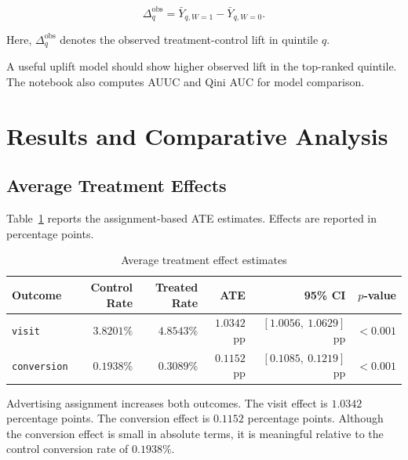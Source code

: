 \documentclass[journal,11pt,onecolumn]{IEEEtran}
\begin{document}
\begin{equation}
    \Delta^{\mathrm{obs}}_q
    =
    \bar{Y}_{q,W=1}
    -
    \bar{Y}_{q,W=0}.
    \label{eq:observed_lift}
\end{equation}

Here, \(\Delta^{\mathrm{obs}}_q\) denotes the observed treatment-control lift in quintile \(q\).

A useful uplift model should show higher observed lift in the top-ranked quintile. The notebook also computes AUUC and Qini AUC for model comparison.

\section{Results and Comparative Analysis}

\subsection{Average Treatment Effects}

Table~\ref{tab:ate_results} reports the assignment-based ATE estimates. Effects are reported in percentage points.

\begin{table}[!htbp]
    \centering
    \caption{Average treatment effect estimates}
    \label{tab:ate_results}
    \small
    \begin{tabular}{lrrrrr}
        \toprule
        Outcome & Control Rate             & Treated Rate & ATE & 95\% CI & \(p\)-value \\
        \midrule
        \texttt{visit}
                & \(3.8201\%\)
                & \(4.8543\%\)
                & \(1.0342\) pp
                & \([1.0056,\ 1.0629]\) pp
                & \(<0.001\)                                                            \\

        \texttt{conversion}
                & \(0.1938\%\)
                & \(0.3089\%\)
                & \(0.1152\) pp
                & \([0.1085,\ 0.1219]\) pp
                & \(<0.001\)                                                            \\
        \bottomrule
    \end{tabular}
\end{table}

Advertising assignment increases both outcomes. The visit effect is \(1.0342\) percentage points. The conversion effect is \(0.1152\) percentage points. Although the conversion effect is small in absolute terms, it is meaningful relative to the control conversion rate of \(0.1938\%\).
\end{document}
